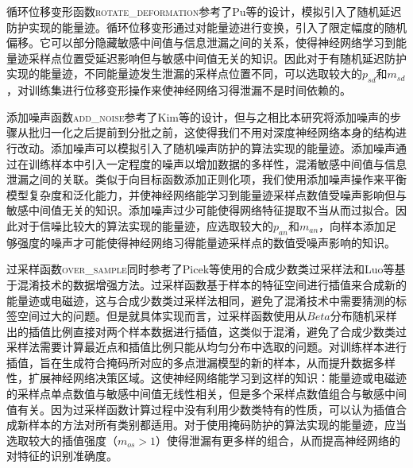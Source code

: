 {	循环位移变形函数\textsc{rotate\_deformation}参考了Pu等\citep{Pu17}的设计，模拟引入了随机延迟防护实现的能量迹。循环位移变形通过对能量迹进行变换，引入了限定幅度的随机偏移。它可以部分隐藏敏感中间值与信息泄漏之间的关系，使得神经网络学习到能量迹采样点位置受延迟影响但与敏感中间值无关的知识。因此对于有随机延迟防护实现的能量迹，不同能量迹发生泄漏的采样点位置不同，可以选取较大的$p_{sd}$和$m_{sd}$，对训练集进行位移变形操作来使神经网络习得泄漏不是时间依赖的。
	
	添加噪声函数\textsc{add\_noise}参考了Kim等\citep{Kim19}的设计，但与之相比本研究将添加噪声的步骤从批归一化之后提前到分批之前，这使得我们不用对深度神经网络本身的结构进行改动。添加噪声可以模拟引入了随机噪声防护的算法实现的能量迹。添加噪声通过在训练样本中引入一定程度的噪声以增加数据的多样性，混淆敏感中间值与信息泄漏之间的关联。类似于向目标函数添加正则化项，我们使用添加噪声操作来平衡模型复杂度和泛化能力，并使神经网络能学习到能量迹采样点数值受噪声影响但与敏感中间值无关的知识。添加噪声过少可能使得网络特征提取不当从而过拟合。因此对于信噪比较大的算法实现的能量迹，应选取较大的$p_{an}$和$m_{an}$，向样本添加足够强度的噪声才可能使得神经网络习得能量迹采样点的数值受噪声影响的知识。
	
	过采样函数\textsc{over\_sample}同时参考了Picek等\citep{Picek19}使用的合成少数类过采样法和Luo等\citep{Luo21}基于混淆技术的数据增强方法。过采样函数基于样本的特征空间进行插值来合成新的能量迹或电磁迹，这与合成少数类过采样法相同，避免了混淆技术中需要猜测的标签空间过大的问题。但是就具体实现而言，过采样函数使用从$Beta$分布随机采样出的插值比例直接对两个样本数据进行插值，这类似于混淆，避免了合成少数类过采样法需要计算最近点和插值比例只能从均匀分布中选取的问题。对训练样本进行插值，旨在生成符合掩码所对应的多点泄漏模型的新的样本，从而提升数据多样性，扩展神经网络决策区域。这使神经网络能学习到这样的知识：能量迹或电磁迹的采样点单点数值与敏感中间值无线性相关，但是多个采样点数值组合与敏感中间值有关。因为过采样函数计算过程中没有利用少数类特有的性质，可以认为插值合成新样本的方法对所有类别都适用。对于使用掩码防护的算法实现的能量迹，应当选取较大的插值强度（$m_{os}>1$）使得泄漏有更多样的组合，从而提高神经网络的对特征的识别准确度。
	
}

